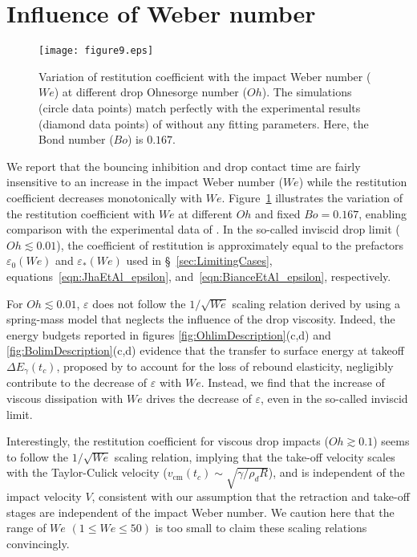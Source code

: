 \documentclass{jfm}
\newcommand{\Ohn}{\mathit{Oh}}
\newcommand{\Wen}{\mathit{We}}
\newcommand{\Bon}{\mathit{Bo}}
\begin{document}
\section{Influence of Weber number}\label{app:Weber}

\begin{figure}
	\centering
	\texttt{[image: figure9.eps]}
	\caption{Variation of restitution coefficient with the impact Weber number ($\Wen$) at different drop Ohnesorge number ($\Ohn$). The simulations (circle data points) match perfectly with the experimental results (diamond data points) of \citet{jha2020viscous} without any fitting parameters. %
	Here, the Bond number ($\Bon$) is $0.167$.}
	\label{fig:AppendixWeber}
\end{figure}

We report that the bouncing inhibition and drop contact time are fairly insensitive to an increase in the impact Weber number ($\Wen$) while the restitution coefficient decreases monotonically with $\Wen$.
Figure~\ref{fig:AppendixWeber} illustrates the variation of the restitution coefficient with $\Wen$ at different $\Ohn$ and fixed $\Bon = 0.167$, enabling comparison with the experimental data of \citet{jha2020viscous}. 
In the so-called inviscid drop limit ($\Ohn \lesssim 0.01$), the coefficient of restitution is approximately equal to the prefactors $\varepsilon_0\left(\Wen\right)$ and $\varepsilon_*\left(\Wen\right)$ used in \S~\ref{sec:LimitingCases}, equations~\eqref{eqn:JhaEtAl_epsilon}, and~\eqref{eqn:BianceEtAl_epsilon}, respectively.

For $\Ohn \lesssim 0.01$, $\varepsilon$ does not follow the $1/\sqrt{\Wen}$ scaling relation derived by \citet{biance2006} using a spring-mass model that neglects the influence of the drop viscosity. 
Indeed, the energy budgets reported in figures \ref{fig:OhlimDescription}(c,d) and \ref{fig:BolimDescription}(c,d) evidence that the transfer to surface energy at takeoff $\Delta E_\gamma(t_c)$,  proposed by \citet{biance2006} to account for the loss of rebound elasticity, negligibly contribute to the decrease of $\varepsilon$ with $\Wen$. 
Instead, we find that the increase of viscous dissipation with $\Wen$ drives the decrease of $\varepsilon$, even in the so-called inviscid limit.

Interestingly, the restitution coefficient for viscous drop impacts ($\Ohn \gtrsim 0.1$) seems to follow the $1/\sqrt{\Wen}$ scaling relation, implying that the take-off velocity scales with the Taylor-Culick velocity ($v_{\text{cm}}(t_c) \sim \sqrt{\gamma/\rho_dR}$), and is independent of the impact velocity $V$, consistent with our assumption that the retraction and take-off stages are independent of the impact Weber number. 
We caution here that the range of $\Wen$ $\left(1 \le \Wen \le 50\right)$ is too small to claim these scaling relations convincingly. 
\end{document}
